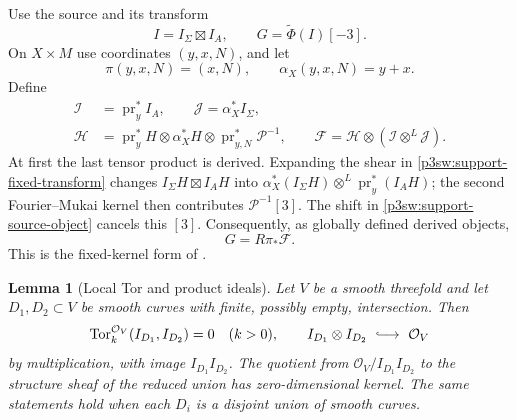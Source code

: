 \documentclass[11pt]{article}
\newtheorem{lemma}[theorem]{Lemma}
\numberwithin{equation}{section}
\begin{document}
Use the source and its transform
\begin{equation}
 I=I_\Sigma\boxtimes I_A,\qquad
 G=\widetilde\Phi(I)[-3].
 \label{p3sw:support-source-object}
\end{equation}
On \(X\times M\) use coordinates \((y,x,N)\), and let
\[
 \pi(y,x,N)=(x,N),\qquad \alpha_X(y,x,N)=y+x.
\]
Define
\begin{equation}
 \begin{split}
 \mathscr I&=\operatorname{pr}_y^*I_A,\qquad
 \mathscr J=\alpha_X^*I_\Sigma,\\
 \mathscr H&=\operatorname{pr}_y^*H\otimes\alpha_X^*H
             \otimes\operatorname{pr}_{y,N}^*\mathcal P^{-1},
 \qquad
 \mathscr F=\mathscr H\otimes
                 (\mathscr I\otimes^L\mathscr J).
 \end{split}
 \label{p3sw:support-kernel-sheaf}
\end{equation}
At first the last tensor product is derived.  Expanding the shear
in \eqref{p3sw:support-fixed-transform} changes \(I_\Sigma H\boxtimes I_AH\) into
\(\alpha_X^*(I_\Sigma H)\otimes^L\operatorname{pr}_y^*(I_AH)\);
the second Fourier--Mukai kernel then contributes
\(\mathcal P^{-1}[3]\).  The shift in \eqref{p3sw:support-source-object} cancels this \([3]\).
Consequently, as globally defined derived objects,
\begin{equation}
 G=R\pi_*\mathscr F.
 \label{p3sw:support-kernel-identity}
\end{equation}
This is the fixed-kernel form of
\cite[(6.2.3) and (9.2.1)]{Markman2025Secant}.

\begin{lemma}[Local Tor and product ideals]
\label{p3sw:support-local-tor}
Let \(V\) be a smooth threefold and let \(D_1,D_2\subset V\) be smooth
curves with finite, possibly empty, intersection.  Then
\begin{equation}
 \operatorname{Tor}^{\mathcal O_V}_k(I_{D_1},I_{D_2})=0
 \quad(k>0),
 \qquad
 I_{D_1}\otimes I_{D_2}\ \lhook\joinrel\longrightarrow\ \mathcal O_V
 \label{p3sw:support-tor-product}
\end{equation}
by multiplication, with image \(I_{D_1}I_{D_2}\).
The quotient from \(\mathcal O_V/I_{D_1}I_{D_2}\) to the structure
sheaf of the reduced union has zero-dimensional kernel.  The same
statements hold when each \(D_i\) is a disjoint union of smooth curves.
\end{lemma}
\end{document}
